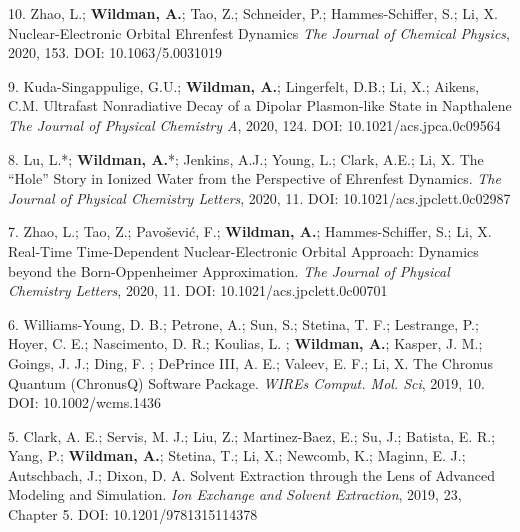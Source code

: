 \begin{cvpublications}

\cvpublication
{10.} 
{Zhao, L.; \textbf{Wildman, A.}; Tao, Z.; Schneider, P.; Hammes-Schiffer, S.; Li, X. Nuclear-Electronic Orbital Ehrenfest Dynamics \textit{The Journal of Chemical Physics}, 2020, 153. DOI: 10.1063/5.0031019}


\cvpublication
{9.} 
{Kuda-Singappulige, G.U.; \textbf{Wildman, A.}; Lingerfelt, D.B.; Li, X.; Aikens, C.M. Ultrafast Nonradiative Decay of a Dipolar Plasmon-like State in Napthalene \textit{The Journal of Physical Chemistry A}, 2020, 124. DOI: 10.1021/acs.jpca.0c09564}


\cvpublication
{8.} 
{Lu, L.*; \textbf{Wildman, A.}*; Jenkins, A.J.; Young, L.; Clark, A.E.; Li, X. The ``Hole'' Story in Ionized Water from the Perspective of Ehrenfest Dynamics. \textit{The Journal of Physical Chemistry Letters}, 2020, 11. DOI: 10.1021/acs.jpclett.0c02987}


\cvpublication
{7.} 
{Zhao, L.; Tao, Z.; Pavo\v{s}evi\'{c}, F.; \textbf{Wildman, A.}; Hammes-Schiffer, S.; Li, X. Real-Time Time-Dependent Nuclear-Electronic Orbital Approach: Dynamics beyond the Born-Oppenheimer Approximation. \textit{The Journal of Physical Chemistry Letters}, 2020, 11. DOI: 10.1021/acs.jpclett.0c00701}


\cvpublication
{6.} 
{Williams-Young, D. B.; Petrone, A.; Sun, S.; Stetina, T. F.; Lestrange, P.;
Hoyer,  C. E.;  Nascimento, D. R.; Koulias, L. ; \textbf{Wildman, A.}; Kasper, J. M.; 
Goings, J. J.; Ding, F. ; DePrince III, A. E.; Valeev, E. F.; Li, X. The Chronus
Quantum (ChronusQ) Software Package. \textit{WIREs Comput. Mol. Sci}, 2019, 10. DOI: 10.1002/wcms.1436}


\cvpublication
{5.} 
{Clark, A. E.; Servis, M. J.; Liu, Z.; Martinez-Baez, E.; Su, J.; Batista, E.
R.; Yang, P.; \textbf{Wildman, A.}; Stetina, T.; Li, X.; Newcomb, K.; Maginn,
E. J.; Autschbach, J.; Dixon, D. A.  Solvent Extraction through the Lens of
Advanced Modeling and Simulation.  \textit{Ion Exchange and Solvent
Extraction}, 2019, 23, Chapter 5. DOI: 10.1201/9781315114378}


\end{cvpublications}
